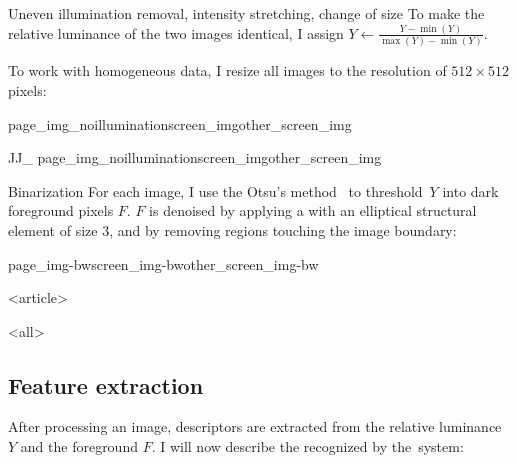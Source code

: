 \begin{description}
\begin{frame}{Uneven illumination removal, intensity stretching, change of size}
    To make the relative luminance of the two images identical, I assign
    $Y\leftarrow\frac{Y-\min(Y)}{\max(Y)-\min(Y)}$.\pause

    To work with homogeneous data, I resize all images to the resolution of
    $512\times 512$ pixels:

      {page_img_noillumination}{screen_img}{other_screen_img}%
  \end{frame}
  \begin{frame}[plain]
      {J}{J_}%
      {page_img_noillumination}{screen_img}{other_screen_img}%
  \end{frame}

  \begin{frame}{Binarization}
    For each image, I use the Otsu's method~\cite{otsu1979threshold} to
    threshold~$Y$ into dark foreground pixels $F$. $F$ is denoised by
    applying a  with an
    elliptical structural element of size 3, and by removing regions touching
    the image boundary:

      {page_img-bw}{screen_img-bw}{other_screen_img-bw}%
  \end{frame}

\mode
<article>
\end{description}

\mode
<all>{%
\subsection{Feature extraction}
\label{sec:features}}
After processing an image, descriptors are extracted from the
relative luminance $Y$ and the foreground $F$. I will now describe the
 recognized by the~system:


